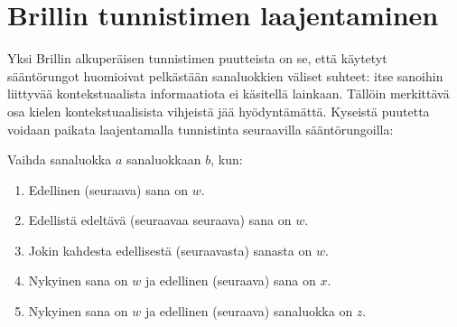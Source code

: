 \documentclass[utf8,bachelor,manualbib]{gradu3}
\begin{document}
\begin{comment}
\begin{table}[H]
\centering
\caption{10 ensimmäistä transformaatiosääntöä Penn Treebank-aineistolla harjoittaessa. Lähde: \citet{brill1995}}
\begin{tabular}{|c|c|c|c|}
\hline
\# & Mistä & Mihin & Ehto \\ \hline
1 & NN & VB & Edellinen sanaluokka on $TO$ \\
2 & VBP & VB & Jokin kolmesta edellisestä sanaluokasta on $MD$ \\
3 & NN & VB & Jokin kahdesta edellisestä sanaluokasta on $MD$ \\
4 & VB & NN & Jokin kahdesta edellisestä sanaluokasta on $DT$ \\
5 & VBD & VBN & Jokin kolmesta edellisestä sanaluokasta on $VBZ$ \\
6 & VBN & VBD & Edellinen sanaluokka on $PRP$ \\
7 & VBN & VBD & Edellinen sanaluokka on $NNP$ \\
8 & VBD & VBN & Edellinen sanaluokka on $VBD$ \\
9 & VBP & VB & Edellinen sanaluokka on $TO$ \\
10 & POS & VBZ & Edellinen sanaluokka on $PRP$ \\ \hline
\end{tabular}
\end{table}
\end{comment}

\section{Brillin tunnistimen laajentaminen}

Yksi Brillin alkuperäisen tunnistimen puutteista on se, että käytetyt sääntörungot huomioivat pelkästään sanaluokkien väliset suhteet: itse sanoihin liittyvää kontekstuaalista informaatiota ei käsitellä lainkaan. Tällöin merkittävä osa kielen kontekstuaalisista vihjeistä jää hyödyntämättä. Kyseistä puutetta voidaan paikata laajentamalla tunnistinta seuraavilla sääntörungoilla:

Vaihda sanaluokka $a$ sanaluokkaan $b$, kun:
\begin{enumerate}
\item Edellinen (seuraava) sana on $w$.
\item Edellistä edeltävä (seuraavaa seuraava) sana on $w$. 
\item Jokin kahdesta edellisestä (seuraavasta) sanasta on $w$.
\item Nykyinen sana on $w$ ja edellinen (seuraava) sana on $x$.
\item Nykyinen sana on $w$ ja edellinen (seuraava) sanaluokka on $z$.
\end{enumerate}
\end{document}
